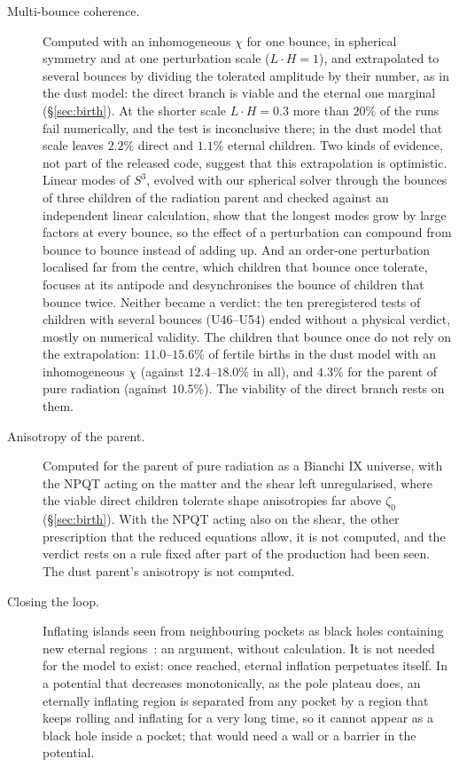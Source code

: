\documentclass[11pt,a4paper]{article}
\begin{document}
\begin{description}
\item[Multi-bounce coherence.] Computed with an inhomogeneous $\chi$ for one bounce, in spherical symmetry and at one perturbation scale ($L\cdot H=1$), and extrapolated to several bounces by dividing the tolerated amplitude by their number, as in the dust model: the direct branch is viable and the eternal one marginal (\S\ref{sec:birth}). At the shorter scale $L\cdot H=0.3$ more than $20\%$ of the runs fail numerically, and the test is inconclusive there; in the dust model that scale leaves $2.2\%$ direct and $1.1\%$ eternal children. Two kinds of evidence, not part of the released code, suggest that this extrapolation is optimistic. Linear modes of $S^3$, evolved with our spherical solver through the bounces of three children of the radiation parent and checked against an independent linear calculation, show that the longest modes grow by large factors at every bounce, so the effect of a perturbation can compound from bounce to bounce instead of adding up. And an order-one perturbation localised far from the centre, which children that bounce once tolerate, focuses at its antipode and desynchronises the bounce of children that bounce twice. Neither became a verdict: the ten preregistered tests of children with several bounces (U46--U54) ended without a physical verdict, mostly on numerical validity. The children that bounce once do not rely on the extrapolation: $11.0$--$15.6\%$ of fertile births in the dust model with an inhomogeneous $\chi$ (against $12.4$--$18.0\%$ in all), and $4.3\%$ for the parent of pure radiation (against $10.5\%$). The viability of the direct branch rests on them.
\item[Anisotropy of the parent.] Computed for the parent of pure radiation as a Bianchi IX universe, with the NPQT acting on the matter and the shear left unregularised, where the viable direct children tolerate shape anisotropies far above $\zeta_0$ (\S\ref{sec:birth}). With the NPQT acting also on the shear, the other prescription that the reduced equations allow, it is not computed, and the verdict rests on a rule fixed after part of the production had been seen. The dust parent's anisotropy is not computed.
\item[Closing the loop.] Inflating islands seen from neighbouring pockets as black holes containing new eternal regions~\cite{GVZ2016}: an argument, without calculation. It is not needed for the model to exist: once reached, eternal inflation perpetuates itself. In a potential that decreases monotonically, as the pole plateau does, an eternally inflating region is separated from any pocket by a region that keeps rolling and inflating for a very long time, so it cannot appear as a black hole inside a pocket; that would need a wall or a barrier in the potential.

\end{description}
\end{document}
